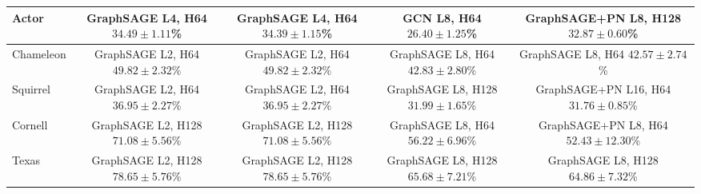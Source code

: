 \documentclass[english]{lni}
\begin{document}
\begin{landscape}
\begin{table}[p]
\begin{tabular*}{\linewidth}{@{\extracolsep{\fill}}lcccc@{}}
Actor &
\makecell{GraphSAGE\\L4, H64\\$34.49\pm1.11$\%} &
\makecell{GraphSAGE\\L4, H64\\$34.39\pm1.15$\%} &
\makecell{GCN\\L8, H64\\$26.40\pm1.25$\%} &
\makecell{GraphSAGE+PN\\L8, H128\\$32.87\pm0.60$\%}\\
\midrule

Chameleon &
\makecell{GraphSAGE\\L2, H64\\$49.82\pm2.32$\%} &
\makecell{GraphSAGE\\L2, H64\\$49.82\pm2.32$\%} &
\makecell{GraphSAGE\\L8, H64\\$42.83\pm2.80$\%} &
\makecell{GraphSAGE\\L8, H64\\$42.57\pm2.74$\%}\\
\midrule

Squirrel &
\makecell{GraphSAGE\\L2, H64\\$36.95\pm2.27$\%} &
\makecell{GraphSAGE\\L2, H64\\$36.95\pm2.27$\%} &
\makecell{GraphSAGE\\L8, H128\\$31.99\pm1.65$\%} &
\makecell{GraphSAGE+PN\\L16, H64\\$31.76\pm0.85$\%}\\
\midrule

Cornell &
\makecell{GraphSAGE\\L2, H128\\$71.08\pm5.56$\%} &
\makecell{GraphSAGE\\L2, H128\\$71.08\pm5.56$\%} &
\makecell{GraphSAGE\\L8, H64\\$56.22\pm6.96$\%} &
\makecell{GraphSAGE+PN\\L8, H64\\$52.43\pm12.30$\%}\\
\midrule

Texas &
\makecell{GraphSAGE\\L2, H128\\$78.65\pm5.76$\%} &
\makecell{GraphSAGE\\L2, H128\\$78.65\pm5.76$\%} &
\makecell{GraphSAGE\\L8, H128\\$65.68\pm7.21$\%} &
\makecell{GraphSAGE\\L8, H128\\$64.86\pm7.32$\%}\\
\midrule


\end{tabular*}
\end{table}
\end{landscape}
\end{document}
